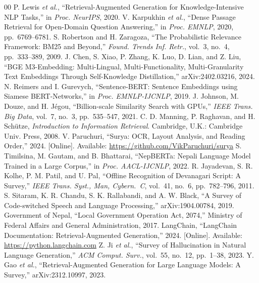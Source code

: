 \documentclass[journal]{IEEEtran}
\begin{document}
\begin{thebibliography}{00}
 P. Lewis \textit{et al.}, ``Retrieval-Augmented Generation for Knowledge-Intensive NLP Tasks,'' in \textit{Proc. NeurIPS}, 2020.
 V. Karpukhin \textit{et al.}, ``Dense Passage Retrieval for Open-Domain Question Answering,'' in \textit{Proc. EMNLP}, 2020, pp.\ 6769--6781.
 S. Robertson and H. Zaragoza, ``The Probabilistic Relevance Framework: BM25 and Beyond,'' \textit{Found. Trends Inf. Retr.}, vol.\ 3, no.\ 4, pp.\ 333--389, 2009.
 J. Chen, S. Xiao, P. Zhang, K. Luo, D. Lian, and Z. Liu, ``BGE M3-Embedding: Multi-Lingual, Multi-Functionality, Multi-Granularity Text Embeddings Through Self-Knowledge Distillation,'' arXiv:2402.03216, 2024.
 N. Reimers and I. Gurevych, ``Sentence-BERT: Sentence Embeddings using Siamese BERT-Networks,'' in \textit{Proc. EMNLP-IJCNLP}, 2019.
 J. Johnson, M. Douze, and H. J\'egou, ``Billion-scale Similarity Search with GPUs,'' \textit{IEEE Trans. Big Data}, vol.\ 7, no.\ 3, pp.\ 535--547, 2021.
 C. D. Manning, P. Raghavan, and H. Sch\"utze, \textit{Introduction to Information Retrieval}. Cambridge, U.K.: Cambridge Univ. Press, 2008.
 V. Paruchuri, ``Surya: OCR, Layout Analysis, and Reading Order,'' 2024. [Online]. Available: \url{https://github.com/VikParuchuri/surya}
 S. Timilsina, M. Gautam, and B. Bhattarai, ``NepBERTa: Nepali Language Model Trained in a Large Corpus,'' in \textit{Proc. AACL-IJCNLP}, 2022.
 R. Jayadevan, S. R. Kolhe, P. M. Patil, and U. Pal, ``Offline Recognition of Devanagari Script: A Survey,'' \textit{IEEE Trans. Syst., Man, Cybern.\ C}, vol.\ 41, no.\ 6, pp.\ 782--796, 2011.
 S. Sitaram, K. R. Chandu, S. K. Rallabandi, and A. W. Black, ``A Survey of Code-switched Speech and Language Processing,'' arXiv:1904.00784, 2019.
 Government of Nepal, ``Local Government Operation Act, 2074,'' Ministry of Federal Affairs and General Administration, 2017.
 LangChain, ``LangChain Documentation: Retrieval-Augmented Generation,'' 2024. [Online]. Available: \url{https://python.langchain.com}
 Z. Ji \textit{et al.}, ``Survey of Hallucination in Natural Language Generation,'' \textit{ACM Comput. Surv.}, vol.\ 55, no.\ 12, pp.\ 1--38, 2023.
 Y. Gao \textit{et al.}, ``Retrieval-Augmented Generation for Large Language Models: A Survey,'' arXiv:2312.10997, 2023.

\end{thebibliography}
\end{document}
